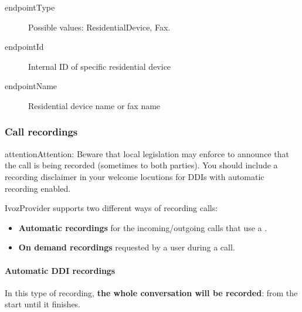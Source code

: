 \documentclass[letterpaper,10pt,english]{sphinxmanual}
\begin{document}
\begin{description}
\item[{endpointType}] \leavevmode{}\label{administration_portal/client/residential/calls/call_csv_schedulers:term-endpointtype}
Possible values: ResidentialDevice, Fax.

\item[{endpointId}] \leavevmode{}\label{administration_portal/client/residential/calls/call_csv_schedulers:term-endpointid}
Internal ID of specific residential device

\item[{endpointName}] \leavevmode{}\label{administration_portal/client/residential/calls/call_csv_schedulers:term-endpointname}
Residential device name or fax name

\end{description}


\subsubsection{Call recordings}
\label{administration_portal/client/residential/calls/call_recordings::doc}\label{administration_portal/client/residential/calls/call_recordings:call-recordings}\label{administration_portal/client/residential/calls/call_recordings:id1}
\begin{notice}{attention}{Attention:}
Beware that local legislation may enforce to announce that the
call is being recorded (sometimes to both parties). You should include
a recording disclaimer in your welcome locutions for DDIs with automatic
recording enabled.
\end{notice}

IvozProvider supports two different ways of recording calls:
\begin{itemize}
\item {} 
\textbf{Automatic recordings} for the incoming/outgoing calls that use a
{\hyperref[administration_portal/client/vpbx/ddis:ddis]{}}.

\item {} 
\textbf{On demand recordings} requested by a user during a call.

\end{itemize}


\paragraph{Automatic DDI recordings}
\label{administration_portal/client/residential/calls/call_recordings:automatic-ddi-recordings}
In this type of recording, \textbf{the whole conversation will be recorded}: from
the start until it finishes.
\end{document}
